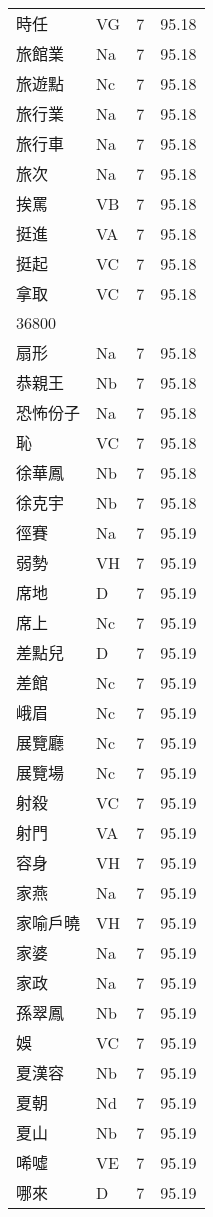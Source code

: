 \documentclass[twocolumn]{book}
\begin{document}
\begin{supertabular}{llrr}
時任 & VG & 7 &  95.18\\
旅館業 & Na & 7 &  95.18\\
旅遊點 & Nc & 7 &  95.18\\
旅行業 & Na & 7 &  95.18\\
旅行車 & Na & 7 &  95.18\\
旅次 & Na & 7 &  95.18\\
挨罵 & VB & 7 &  95.18\\
挺進 & VA & 7 &  95.18\\
挺起 & VC & 7 &  95.18\\
拿取 & VC & 7 &  95.18\\
36800\\
扇形 & Na & 7 &  95.18\\
恭親王 & Nb & 7 &  95.18\\
恐怖份子 & Na & 7 &  95.18\\
恥 & VC & 7 &  95.18\\
徐華鳳 & Nb & 7 &  95.18\\
徐克宇 & Nb & 7 &  95.18\\
徑賽 & Na & 7 &  95.19\\
弱勢 & VH & 7 &  95.19\\
席地 & D & 7 &  95.19\\
席上 & Nc & 7 &  95.19\\
差點兒 & D & 7 &  95.19\\
差館 & Nc & 7 &  95.19\\
峨眉 & Nc & 7 &  95.19\\
展覽廳 & Nc & 7 &  95.19\\
展覽場 & Nc & 7 &  95.19\\
射殺 & VC & 7 &  95.19\\
射門 & VA & 7 &  95.19\\
容身 & VH & 7 &  95.19\\
家燕 & Na & 7 &  95.19\\
家喻戶曉 & VH & 7 &  95.19\\
家婆 & Na & 7 &  95.19\\
家政 & Na & 7 &  95.19\\
孫翠鳳 & Nb & 7 &  95.19\\
娛 & VC & 7 &  95.19\\
夏漢容 & Nb & 7 &  95.19\\
夏朝 & Nd & 7 &  95.19\\
夏山 & Nb & 7 &  95.19\\
唏噓 & VE & 7 &  95.19\\
哪來 & D & 7 &  95.19\\

\end{supertabular}
\end{document}
